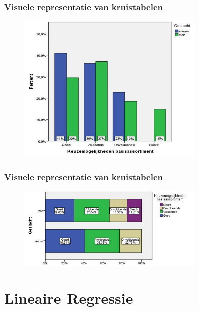 \documentclass{beamer}
\begin{document}
    \begin{frame}
      \frametitle{Visuele representatie van kruistabelen}

      \begin{figure}
        \centering
        \includegraphics[width=0.80\textwidth]{img/les3-bar1.jpg}
        \label{fig:les3-bar1}
      \end{figure}

    \end{frame}

    \begin{frame}
      \frametitle{Visuele representatie van kruistabelen}

      \begin{figure}
        \centering
        \includegraphics[width=0.80\textwidth]{img/les3-stacked.jpg}
        \label{fig:les3-stacked}
      \end{figure}

    \end{frame}

    \section{Lineaire Regressie}
    \sectionframelogo{}
\end{document}
